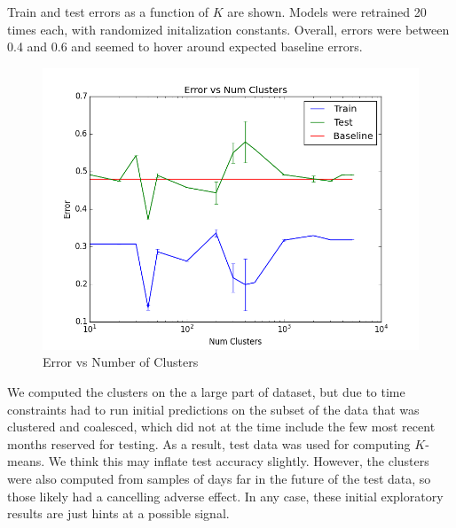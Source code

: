Train and test errors as a function of $K$ are shown. Models were retrained 20 times each, with randomized initalization constants. Overall, errors were between 0.4 and 0.6 and seemed to hover around expected baseline errors. 


\begin{figure}[ht]
\vskip 0.2in
\begin{center}
\centerline{\includegraphics[scale=0.15]{images/error_v_k.png}}
\caption{Error vs Number of Clusters}
\end{center}
\vskip -0.2in
\label{fig:error_v_k}
\end{figure} 

We computed the clusters on the a large part of dataset, but due to time constraints had to run initial predictions on the subset of the data that was clustered and coalesced, which did not at the time include the few most recent months reserved for testing. As a result, test data was used for computing $K$-means. We think this may inflate test accuracy slightly. However, the clusters were also computed from samples of days far in the future of the test data, so those likely had a cancelling adverse effect. In any case, these initial exploratory results are just hints at a possible signal.